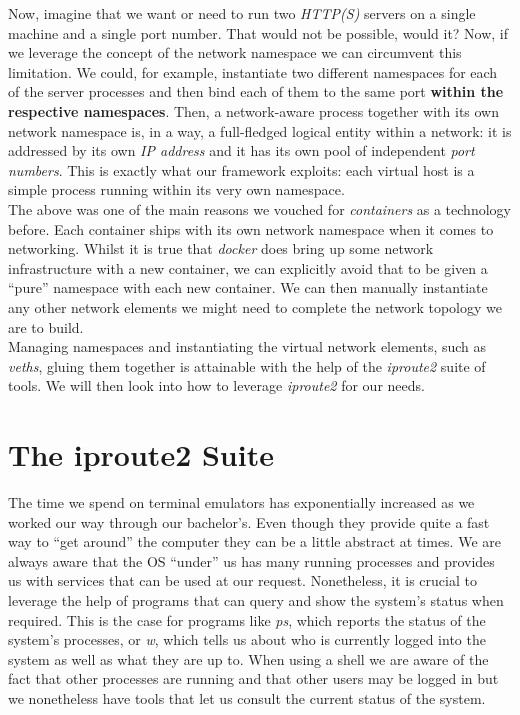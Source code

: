             Now, imagine that we want or need to run two \textit{HTTP(S)} servers on a single machine and a single port number. That would not be possible, would it? Now, if we leverage the concept of the network namespace we can circumvent this limitation. We could, for example, instantiate two different namespaces for each of the server processes and then bind each of them to the same port \textbf{within the respective namespaces}. Then, a network-aware process together with its own network namespace is, in a way, a full-fledged logical entity within a network: it is addressed by its own \textit{IP address} and it has its own pool of independent \textit{port numbers}. This is exactly what our framework exploits: each virtual host is a simple process running within its very own namespace.\\

        The above was one of the main reasons we vouched for \textit{containers} as a technology before. Each container ships with its own network namespace when it comes to networking. Whilst it is true that \textit{docker} does bring up some network infrastructure with a new container, we can explicitly avoid that to be given a ``pure'' namespace with each new container. We can then manually instantiate any other network elements we might need to complete the network topology we are to build.\\

        Managing namespaces and instantiating the virtual network elements, such as \textit{veths}, gluing them together is attainable with the help of the \textit{iproute2} suite of tools. We will then look into how to leverage \textit{iproute2} for our needs.\\

    \section{The iproute2 Suite}
        The time we spend on terminal emulators has exponentially increased as we worked our way through our bachelor's. Even though they provide quite a fast way to ``get around'' the computer they can be a little abstract at times. We are always aware that the OS ``under'' us has many running processes and provides us with services that can be used at our request. Nonetheless, it is crucial to leverage the help of programs that can query and show the system's status when required. This is the case for programs like \textit{ps}, which reports the status of the system's processes, or \textit{w}, which tells us about who is currently logged into the system as well as what they are up to. When using a shell we are aware of the fact that other processes are running and that other users may be logged in but we nonetheless have tools that let us consult the current status of the system.\\

